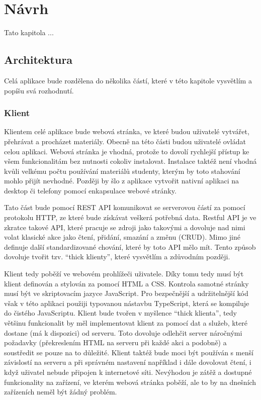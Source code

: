 \chapter{Návrh}

\begin{chapterabstract}
Tato kapitola ...
\end{chapterabstract}

\section{Architektura}

Celá aplikace bude rozdělena do několika částí, které v této kapitole vysvětlím a popíšu svá rozhodnutí.

\subsection{Klient}\label{text:navrh/klient}

Klientem celé aplikace bude webová stránka, ve které budou uživatelé vytvářet, přehrávat a procházet materiály. 
Obecně na této části budou uživatelé ovládat celou aplikaci.
Webová stránka je vhodná, protože to dovolí rychlejší přístup ke všem funkcionalitám bez nutnosti cokoliv instalovat.
Instalace taktéž není vhodná kvůli velkému počtu používání materiálů studenty, kterým by toto stahování mohlo přijít nevhodné.
Později by šlo z aplikace vytvořit nativní aplikaci na desktop či telefony pomocí enkapsulace webové stránky.

Tato část bude pomocí REST API komunikovat se serverovou částí za pomocí protokolu HTTP, ze které bude získávat veškerá potřebná data.
Restful API je ve zkratce takové API, které pracuje se zdroji jako takovými a dovoluje nad nimi volat klasické akce jako čtení, přidání, smazání a změnu (CRUD).
Mimo jiné definuje další standardizované chování, které by toto API mělo mít.
Tento způsob dovoluje tvořit tzv. \enquote{thick klienty}, které vysvětlím a zdůvodním později.

Klient tedy poběží ve webovém prohlížeči uživatele.
Díky tomu tedy musí být klient definován a stylován za pomocí HTML a CSS.
Kontrola samotné stránky musí být ve skriptovacím jazyce JavaScript.
Pro bezpečnější a udržitelnější kód však v této aplikaci použiji typovanou nástavbu TypeScript, která se kompiluje do čistého JavaScriptu.
Klient bude tvořen v myšlence \enquote{thick klienta}, tedy většinu funkcionalit by měl implementovat klient za pomocí dat a služeb, které dostane (má k dispozici) od serveru.
Toto dovoluje odlehčit server náročnými požadavky (překreslením HTML na serveru při každé akci a podobně) a soustředit se pouze na to důležité.
Klient taktéž bude moci být používán s menší závislostí na serveru a při správném nastavení například i dále dovolovat čtení, i když uživatel nebude připojen k internetové síti.
Nevýhodou je zátěž a dostupné funkcionality na zařízení, ve kterém webová stránka poběží, ale to by na dnešních zařízeních neměl být žádný problém.

